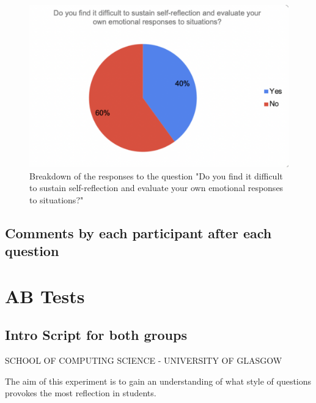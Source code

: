 \documentclass{l4proj}
\begin{document}
\begin{appendices}
\begin{figure}[H]
    \begin{centering}
    \includegraphics[scale=0.5]{images/GradAttr-8.pdf}
    \caption{Breakdown of the responses to the question "Do you find it difficult to sustain self-reflection and evaluate your own emotional responses to situations?"}
    \label{fig: GradAttr-8}
    \end{centering}
\end{figure}

\subsection{Comments by each participant after each question}



%

\section{AB Tests} \label{Appendix-ABTests}

\subsection{Intro Script for both groups}
SCHOOL OF COMPUTING SCIENCE - UNIVERSITY OF GLASGOW

The aim of this experiment is to gain an understanding of what style of questions provokes the most reflection in students. 


\end{appendices}
\end{document}
